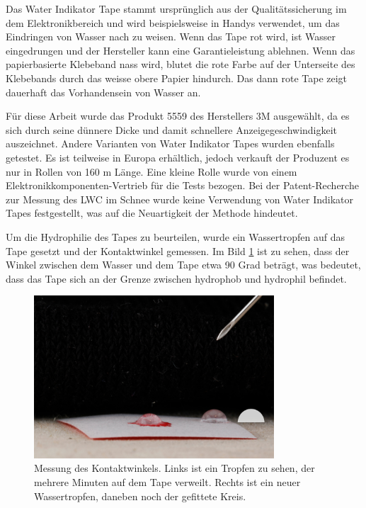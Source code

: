 Das Water Indikator Tape stammt ursprünglich aus der Qualitätssicherung im dem Elektronikbereich und wird beispielsweise in Handys verwendet, um das Eindringen von Wasser nach zu weisen. Wenn das Tape rot wird, ist Wasser eingedrungen und der Hersteller kann eine Garantieleistung ablehnen. Wenn das papierbasierte Klebeband nass wird, blutet die rote Farbe auf der Unterseite des Klebebands durch das weisse obere Papier hindurch. Das dann rote Tape zeigt dauerhaft das Vorhandensein von Wasser an.

Für diese Arbeit wurde das Produkt 5559 des Herstellers 3M ausgewählt, da es sich durch seine dünnere Dicke und damit schnellere Anzeigegeschwindigkeit auszeichnet. Andere Varianten von Water Indikator Tapes wurden ebenfalls getestet. Es ist teilweise in Europa erhältlich, jedoch verkauft der Produzent es nur in Rollen von 160 m Länge. Eine kleine Rolle wurde von einem Elektronikkomponenten-Vertrieb für die Tests bezogen. Bei der Patent-Recherche zur Messung des LWC im Schnee wurde keine Verwendung von Water Indikator Tapes festgestellt, was auf die Neuartigkeit der Methode hindeutet.

Um die Hydrophilie des Tapes zu beurteilen, wurde ein Wassertropfen auf das Tape gesetzt und der Kontaktwinkel gemessen. Im Bild \ref{fig:winkTropf} ist zu sehen, dass der Winkel zwischen dem Wasser und dem Tape etwa 90 Grad beträgt, was bedeutet, dass das Tape sich an der Grenze zwischen hydrophob und hydrophil befindet.

\begin{figure}
    \centering
    \includegraphics[width=0.8\textwidth]{Bilder/IMG_6683.JPG}
    \caption{Messung des Kontaktwinkels. Links ist ein Tropfen zu sehen, der mehrere Minuten auf dem Tape verweilt. Rechts ist ein neuer Wassertropfen, daneben noch der gefittete Kreis.} 
    \label{fig:winkTropf}
\end{figure}

